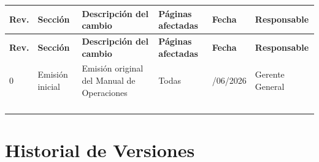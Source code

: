 \begin{longtable}{|>{\centering\arraybackslash}p{1.2cm}|>{\centering\arraybackslash}p{2.1cm}|p{4.2cm}|>{\centering\arraybackslash}p{2.2cm}|>{\centering\arraybackslash}p{1.8cm}|p{2.5cm}|}

\hline

\rowcolor{gray!20}

\textbf{Rev.} &
\textbf{Sección} &
\textbf{Descripción del cambio} &
\textbf{Páginas afectadas} &
\textbf{Fecha} &
\textbf{Responsable}

\\
\hline
\endfirsthead

\hline

\rowcolor{gray!20}

\textbf{Rev.} &
\textbf{Sección} &
\textbf{Descripción del cambio} &
\textbf{Páginas afectadas} &
\textbf{Fecha} &
\textbf{Responsable}

\\
\hline

\endhead

0 &
Emisión inicial &
Emisión original del Manual de Operaciones &
Todas &
23/06/2026 &
Gerente General

\\
\hline

&
&
&
&
&
\\
\hline

&
&
&
&
&
\\
\hline

&
&
&
&
&
\\
\hline

&
&
&
&
&
\\
\hline

\end{longtable}

\vspace{0.7cm}


\section*{Historial de Versiones}

\renewcommand{\arraystretch}{1.35}

